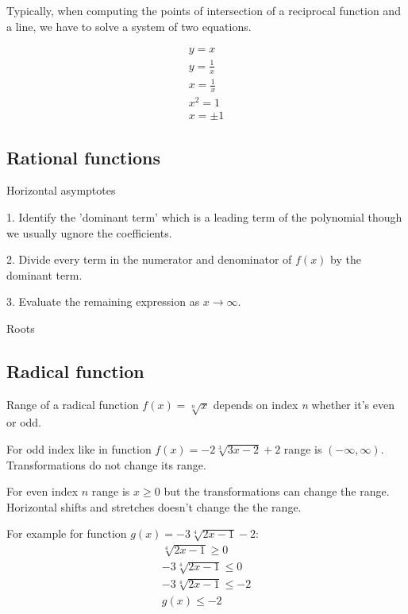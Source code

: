 \documentclass{article}
\begin{document}

Typically, when computing the points of intersection of a reciprocal
function and a line, we have to solve a system of two equations.

\begin{equation}
  \begin{gathered}
    y = x \\
    y = \frac{1}{x} \\
    x = \frac{1}{x} \\
    x^2 = 1 \\
    x = \pm 1
  \end{gathered}
\end{equation}

\subsection{Rational functions}
Horizontal asymptotes

1. Identify the 'dominant term' which is a leading term of the polynomial though we
usually ugnore the coefficients.

2. Divide every term in the numerator and denominator of $f(x)$ by the dominant term.

3. Evaluate the remaining expression as $x \to \infty$.


Roots


\subsection{Radical function}
Range of a radical function $f(x) = \sqrt[n]{x}$ depends on index \textit{n} whether it's even or odd.

For odd index like in function $f(x) = -2\sqrt[3]{3x-2}+2$ range is $(-\infty, \infty)$.
Transformations do not change its range.

For even index $n$ range is $x \geqslant 0$ but the transformations can change the range.
Horizontal shifts and stretches doesn't change the the range.

For example for function $g(x) = -3\sqrt[4]{2x-1}-2$:
\begin{equation}
  \begin{gathered}
  \sqrt[4]{2x-1} \geqslant 0 \\
  -3\sqrt[4]{2x-1} \leqslant 0 \\
  -3\sqrt[4]{2x-1} \leqslant -2 \\
  g(x) \leqslant -2
  \end{gathered}
\end{equation}
\end{document}
